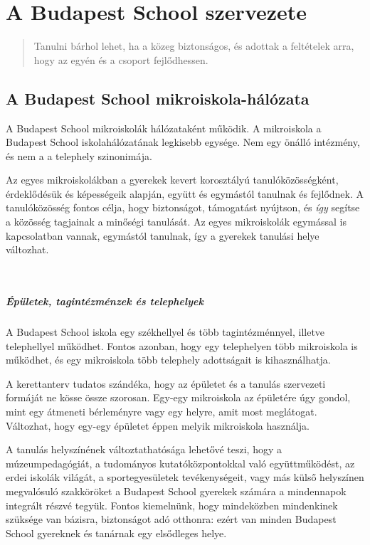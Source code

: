 
\chapter{A Budapest School szervezete}
\begin{quote}
Tanulni bárhol lehet, ha a közeg biztonságos, és adottak a feltételek arra, hogy az egyén és a csoport fejlődhessen.
\end{quote}

\section{A Budapest School mikroiskola-hálózata}

 A Budapest School mikroiskolák hálózataként működik. A mikroiskola a Budapest School iskolahálózatának legkisebb egysége. Nem egy önálló intézmény, és nem a a telephely szinonimája.

Az egyes mikroiskolákban a gyerekek kevert korosztályú tanulóközösségként,
érdeklődésük és képességeik alapján, együtt és egymástól tanulnak és fejlődnek.
A tanulóközösség fontos célja, hogy biztonságot, támogatást nyújtson, és \emph{így} segítse a közösség tagjainak a minőségi tanulását. Az egyes mikroiskolák egymással is kapcsolatban vannak,
egymástól tanulnak, így a gyerekek tanulási helye változhat.

 \paragraph{Épületek, tagintézménzek és telephelyek}
A Budapest School iskola egy székhellyel és több tagintézménnyel, illetve telephellyel működhet. Fontos azonban, hogy egy telephelyen több mikroiskola is működhet, és egy mikroiskola több telephely adottságait is kihasználhatja.

A kerettanterv tudatos szándéka, hogy az épületet és a
tanulás szervezeti formáját ne kösse össze szorosan. Egy-egy mikroiskola az épületére úgy gondol, mint egy átmeneti bérleményre vagy egy helyre, amit most meglátogat.
Változhat, hogy egy-egy épületet éppen melyik mikroiskola használja.

A tanulás helyszínének változtathatósága lehetővé teszi, hogy a múzeumpedagógiát, a tudományos kutatóközpontokkal való együttműködést, az erdei iskolák világát, a sportegyesületek tevékenységeit, vagy más külső helyszínen megvalósuló szakköröket a Budapest School gyerekek számára a mindennapok integrált részvé tegyük. Fontos kiemelnünk, hogy mindeközben mindenkinek szüksége van bázisra, biztonságot adó otthonra: ezért van minden Budapest School gyereknek és tanárnak egy elsődleges helye.

